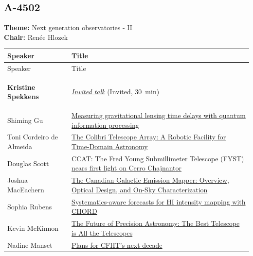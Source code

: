 \subsection*{A-4502}
\textbf{Theme:} Next generation observatories - II\\
\textbf{Chair:} Renée Hlozek\\
{\small
{}
\sloppy
\setlength{\emergencystretch}{1em}
\begin{longtable}{@{}>{\TableRaggedRight\arraybackslash\hspace{0pt}}p{} >{\TableRaggedRight\arraybackslash\hspace{0pt}}p{}@{}}
\toprule
Speaker & Title \\
\midrule
\endfirsthead
\toprule
Speaker & Title \\
\midrule
\endhead
\hypertarget{invited-kristine-spekkens-sched}{}\label{invited-page-kristine-spekkens-sched}{\bfseries\color{cascagold}Kristine Spekkens} & \hyperlink{invited-kristine-spekkens}{\emph{Invited talk}} {\small\color{cascagold}(Invited, 30~min)} \\
\hypertarget{schedule-talk-49}{}\label{schedule-page-talk-49}Shiming Gu & \hyperlink{abstract-talk-49}{Measuring gravitational lensing time delays with quantum information processing} \\
\hypertarget{schedule-talk-265}{}\label{schedule-page-talk-265}Toni Cordeiro de Almeida & \hyperlink{abstract-talk-265}{The Colibri Telescope Array: A Robotic Facility for Time-Domain Astronomy} \\
\hypertarget{schedule-talk-156}{}\label{schedule-page-talk-156}Douglas Scott & \hyperlink{abstract-talk-156}{CCAT: The Fred Young Submillimeter Telescope (FYST) nears first light on Cerro Chajnantor} \\
\hypertarget{schedule-talk-290}{}\label{schedule-page-talk-290}Joshua MacEachern & \hyperlink{abstract-talk-290}{The Canadian Galactic Emission Mapper: Overview, Optical Design, and On-Sky Characterization} \\
\hypertarget{schedule-talk-43}{}\label{schedule-page-talk-43}Sophia Rubens & \hyperlink{abstract-talk-43}{Systematics-aware forecasts for HI intensity mapping with CHORD} \\
\hypertarget{schedule-talk-110}{}\label{schedule-page-talk-110}Kevin McKinnon & \hyperlink{abstract-talk-110}{The Future of Precision Astronomy: The Best Telescope is All the Telescopes} \\
\hypertarget{schedule-talk-157}{}\label{schedule-page-talk-157}Nadine Manset & \hyperlink{abstract-talk-157}{Plans for CFHT's next decade} \\

\end{longtable}}
